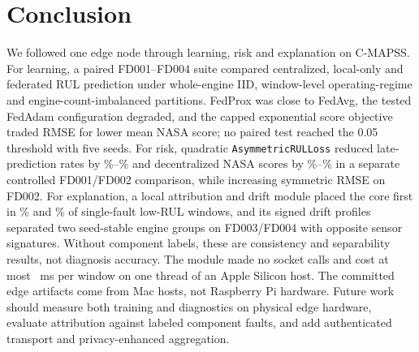 \section{Conclusion}
\label{sec:conclusion}
We followed one edge node through learning, risk and explanation on C-MAPSS. For learning, a paired FD001--FD004 suite compared centralized, local-only and federated RUL prediction under whole-engine IID, window-level operating-regime and engine-count-imbalanced partitions. FedProx was close to FedAvg, the tested FedAdam configuration degraded, and the capped exponential score objective traded RMSE for lower mean NASA score; no paired test reached the 0.05 threshold with five seeds. For risk, quadratic \texttt{AsymmetricRULLoss} reduced late-prediction rates by \AsymLateReductionMin{}\%--\AsymLateReductionMax{}\% and decentralized NASA scores by \AsymDecentralNasaReductionMin{}\%--\AsymDecentralNasaReductionMax{}\% in a separate controlled FD001/FD002 comparison, while increasing symmetric RMSE on FD002. For explanation, a local attribution and drift module placed the core first in \DiagFdOneAttrCore{}\% and \DiagFdTwoAttrCore{}\% of single-fault low-RUL windows, and its signed drift profiles separated two seed-stable engine groups on FD003/FD004 with opposite sensor signatures. Without component labels, these are consistency and separability results, not diagnosis accuracy. The module made no socket calls and cost at most \DiagLatFullMax{}~ms per window on one thread of an Apple Silicon host. The committed edge artifacts come from Mac hosts, not Raspberry Pi hardware. Future work should measure both training and diagnostics on physical edge hardware, evaluate attribution against labeled component faults, and add authenticated transport and privacy-enhanced aggregation.
